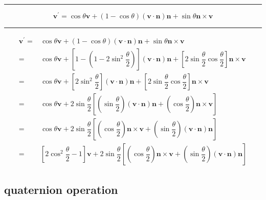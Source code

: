 \documentclass[
]{book}
\theoremstyle{definition}
\theoremstyle{definition}
\theoremstyle{definition}
\theoremstyle{definition}
\theoremstyle{remark}
\begin{document}
\begin{center}\rule{0.5\linewidth}{0.5pt}\end{center}

\[
\boldsymbol{v}^{\prime}=\cos\theta\boldsymbol{v}+\left(1-\cos\theta\right)\left(\boldsymbol{v}\cdot\boldsymbol{n}\right)\boldsymbol{n}+\sin\theta\boldsymbol{n}\times\boldsymbol{v}
\]

\begin{center}\rule{0.5\linewidth}{0.5pt}\end{center}

\[
\begin{aligned}
\boldsymbol{v}^{\prime}= & \cos\theta\boldsymbol{v}+\left(1-\cos\theta\right)\left(\boldsymbol{v}\cdot\boldsymbol{n}\right)\boldsymbol{n}+\sin\theta\boldsymbol{n}\times\boldsymbol{v}\\
= & \cos\theta\boldsymbol{v}+\left[1-\left(1-2\sin^{2}\dfrac{\theta}{2}\right)\right]\left(\boldsymbol{v}\cdot\boldsymbol{n}\right)\boldsymbol{n}+\left[2\sin\dfrac{\theta}{2}\cos\dfrac{\theta}{2}\right]\boldsymbol{n}\times\boldsymbol{v}\\
= & \cos\theta\boldsymbol{v}+\left[2\sin^{2}\dfrac{\theta}{2}\right]\left(\boldsymbol{v}\cdot\boldsymbol{n}\right)\boldsymbol{n}+\left[2\sin\dfrac{\theta}{2}\cos\dfrac{\theta}{2}\right]\boldsymbol{n}\times\boldsymbol{v}\\
= & \cos\theta\boldsymbol{v}+2\sin\dfrac{\theta}{2}\left[\left(\sin\dfrac{\theta}{2}\right)\left(\boldsymbol{v}\cdot\boldsymbol{n}\right)\boldsymbol{n}+\left(\cos\dfrac{\theta}{2}\right)\boldsymbol{n}\times\boldsymbol{v}\right]\\
= & \cos\theta\boldsymbol{v}+2\sin\dfrac{\theta}{2}\left[\left(\cos\dfrac{\theta}{2}\right)\boldsymbol{n}\times\boldsymbol{v}+\left(\sin\dfrac{\theta}{2}\right)\left(\boldsymbol{v}\cdot\boldsymbol{n}\right)\boldsymbol{n}\right]\\
= & \left[2\cos^{2}\dfrac{\theta}{2}-1\right]\boldsymbol{v}+2\sin\dfrac{\theta}{2}\left[\left(\cos\dfrac{\theta}{2}\right)\boldsymbol{n}\times\boldsymbol{v}+\left(\sin\dfrac{\theta}{2}\right)\left(\boldsymbol{v}\cdot\boldsymbol{n}\right)\boldsymbol{n}\right]
\end{aligned}
\]

\hypertarget{quaternion-operation}{%
\subsection{quaternion operation}\label{quaternion-operation}}
\end{document}
